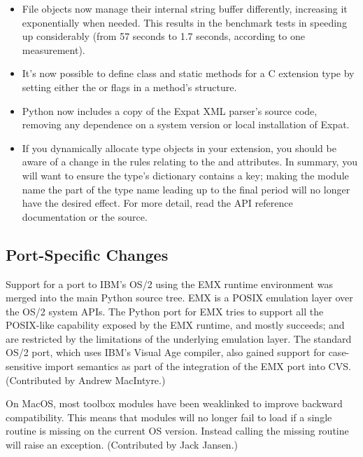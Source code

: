 \documentclass{howto}
\begin{document}
\begin{itemize}
\item File objects now manage their internal string buffer
differently, increasing it exponentially when needed.  This results in
the benchmark tests in  speeding up
considerably (from 57 seconds to 1.7 seconds, according to one
measurement).

\item It's now possible to define class and static methods for a C
extension type by setting either the  or
 flags in a method's 
structure.

\item Python now includes a copy of the Expat XML parser's source code,
removing any dependence on a system version or local installation of
Expat.

\item If you dynamically allocate type objects in your extension, you
should be aware of a change in the rules relating to the
 and  attributes.  In summary,
you will want to ensure the type's dictionary contains a
 key; making the module name the part of the type
name leading up to the final period will no longer have the desired
effect.  For more detail, read the API reference documentation or the 
source.

\end{itemize}


\subsection{Port-Specific Changes}

Support for a port to IBM's OS/2 using the EMX runtime environment was
merged into the main Python source tree.  EMX is a POSIX emulation
layer over the OS/2 system APIs.  The Python port for EMX tries to
support all the POSIX-like capability exposed by the EMX runtime, and
mostly succeeds;  and  are
restricted by the limitations of the underlying emulation layer.  The
standard OS/2 port, which uses IBM's Visual Age compiler, also gained
support for case-sensitive import semantics as part of the integration
of the EMX port into CVS.  (Contributed by Andrew MacIntyre.)

On MacOS, most toolbox modules have been weaklinked to improve
backward compatibility.  This means that modules will no longer fail
to load if a single routine is missing on the current OS version.
Instead calling the missing routine will raise an exception.
(Contributed by Jack Jansen.)
\end{document}
